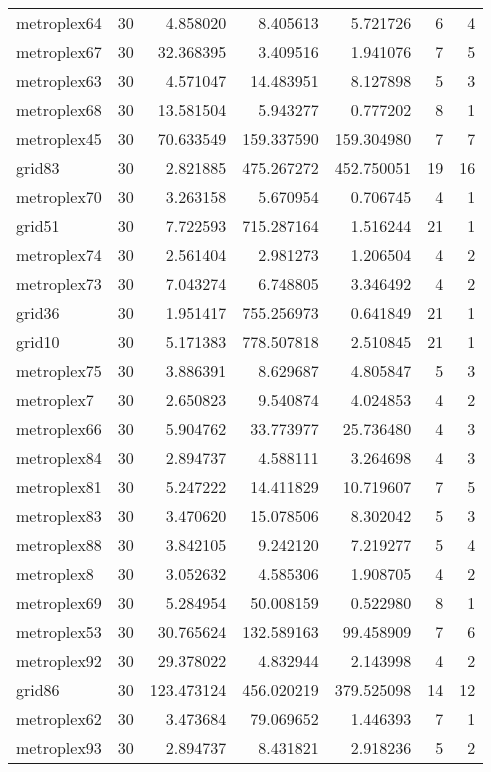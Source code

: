 \begin{longtable}{|l|r|r|r|r|r|r|}
metroplex64 & 30 & 4.858020 & 8.405613 & 5.721726 & 6 & 4 \\
metroplex67 & 30 & 32.368395 & 3.409516 & 1.941076 & 7 & 5 \\
metroplex63 & 30 & 4.571047 & 14.483951 & 8.127898 & 5 & 3 \\
metroplex68 & 30 & 13.581504 & 5.943277 & 0.777202 & 8 & 1 \\
metroplex45 & 30 & 70.633549 & 159.337590 & 159.304980 & 7 & 7 \\
grid83 & 30 & 2.821885 & 475.267272 & 452.750051 & 19 & 16 \\
metroplex70 & 30 & 3.263158 & 5.670954 & 0.706745 & 4 & 1 \\
grid51 & 30 & 7.722593 & 715.287164 & 1.516244 & 21 & 1 \\
metroplex74 & 30 & 2.561404 & 2.981273 & 1.206504 & 4 & 2 \\
metroplex73 & 30 & 7.043274 & 6.748805 & 3.346492 & 4 & 2 \\
grid36 & 30 & 1.951417 & 755.256973 & 0.641849 & 21 & 1 \\
grid10 & 30 & 5.171383 & 778.507818 & 2.510845 & 21 & 1 \\
metroplex75 & 30 & 3.886391 & 8.629687 & 4.805847 & 5 & 3 \\
metroplex7 & 30 & 2.650823 & 9.540874 & 4.024853 & 4 & 2 \\
metroplex66 & 30 & 5.904762 & 33.773977 & 25.736480 & 4 & 3 \\
metroplex84 & 30 & 2.894737 & 4.588111 & 3.264698 & 4 & 3 \\
metroplex81 & 30 & 5.247222 & 14.411829 & 10.719607 & 7 & 5 \\
metroplex83 & 30 & 3.470620 & 15.078506 & 8.302042 & 5 & 3 \\
metroplex88 & 30 & 3.842105 & 9.242120 & 7.219277 & 5 & 4 \\
metroplex8 & 30 & 3.052632 & 4.585306 & 1.908705 & 4 & 2 \\
metroplex69 & 30 & 5.284954 & 50.008159 & 0.522980 & 8 & 1 \\
metroplex53 & 30 & 30.765624 & 132.589163 & 99.458909 & 7 & 6 \\
metroplex92 & 30 & 29.378022 & 4.832944 & 2.143998 & 4 & 2 \\
grid86 & 30 & 123.473124 & 456.020219 & 379.525098 & 14 & 12 \\
metroplex62 & 30 & 3.473684 & 79.069652 & 1.446393 & 7 & 1 \\
metroplex93 & 30 & 2.894737 & 8.431821 & 2.918236 & 5 & 2 \\

\end{longtable}
